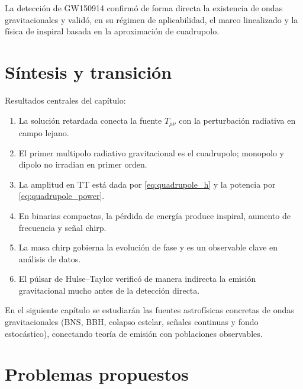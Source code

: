 \begin{importante}
La detección de GW150914 \cite{Abbott2016prl} confirmó de forma directa la existencia de ondas gravitacionales y validó, en su régimen de aplicabilidad, el marco linealizado y la física de inspiral basada en la aproximación de cuadrupolo.
\end{importante}

\section{Síntesis y transición}
\label{sec:sintesis_cap16}

Resultados centrales del capítulo:
\begin{enumerate}[leftmargin=2em, label=\textbf{\arabic*.}]
  \item La solución retardada conecta la fuente $T_{\mu\nu}$ con la perturbación radiativa en campo lejano.
  \item El primer multipolo radiativo gravitacional es el cuadrupolo; monopolo y dipolo no irradian en primer orden.
  \item La amplitud en TT está dada por \eqref{eq:quadrupole_h} y la potencia por \eqref{eq:quadrupole_power}.
  \item En binarias compactas, la pérdida de energía produce inspiral, aumento de frecuencia y señal chirp.
  \item La masa chirp gobierna la evolución de fase y es un observable clave en análisis de datos.
  \item El púlsar de Hulse--Taylor verificó de manera indirecta la emisión gravitacional mucho antes de la detección directa.
\end{enumerate}

En el siguiente capítulo se estudiarán las fuentes astrofísicas concretas de ondas gravitacionales (BNS, BBH, colapso estelar, señales continuas y fondo estocástico), conectando teoría de emisión con poblaciones observables.

\section*{Problemas propuestos}

